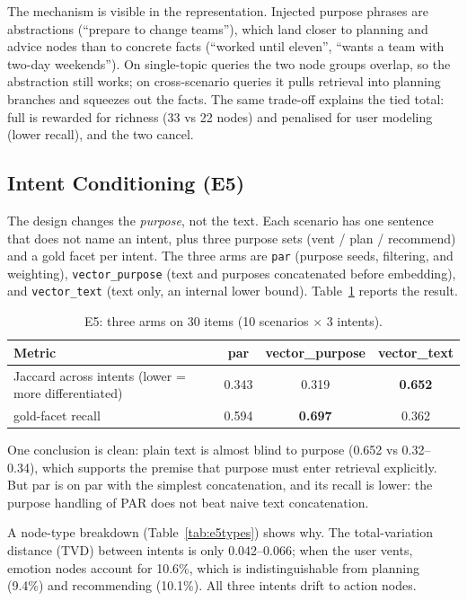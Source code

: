\documentclass[11pt]{article}
\begin{document}
The mechanism is visible in the representation. Injected purpose phrases are abstractions
(``prepare to change teams''), which land closer to planning and advice nodes than to concrete
facts (``worked until eleven'', ``wants a team with two-day weekends''). On single-topic queries
the two node groups overlap, so the abstraction still works; on cross-scenario queries it pulls
retrieval into planning branches and squeezes out the facts. The same trade-off explains the tied
total: full is rewarded for richness (33 vs 22 nodes) and penalised for user modeling (lower
recall), and the two cancel.

\subsection{Intent Conditioning (E5)}
\label{sec:e5}

The design changes the \emph{purpose}, not the text. Each scenario has one sentence that does not
name an intent, plus three purpose sets (vent / plan / recommend) and a gold facet per intent.
The three arms are \texttt{par} (purpose seeds, filtering, and weighting), \texttt{vector\_purpose}
(text and purposes concatenated before embedding), and \texttt{vector\_text} (text only, an
internal lower bound). Table~\ref{tab:e5} reports the result.

\begin{table}[t]
  \centering
  \small
  \begin{tabular}{@{}lccc@{}}
    \toprule
    Metric & par & vector\_purpose & vector\_text \\
    \midrule
    Jaccard across intents (lower = more differentiated) & 0.343 & 0.319 & \textbf{0.652} \\
    gold-facet recall & 0.594 & \textbf{0.697} & 0.362 \\
    \bottomrule
  \end{tabular}
  \caption{E5: three arms on 30 items (10 scenarios $\times$ 3 intents).}\label{tab:e5}
\end{table}

One conclusion is clean: plain text is almost blind to purpose (0.652 vs 0.32--0.34), which
supports the premise that purpose must enter retrieval explicitly. But par is on par with the
simplest concatenation, and its recall is lower: the purpose handling of PAR does not beat naive
text concatenation.

A node-type breakdown (Table~\ref{tab:e5types}) shows why. The total-variation distance (TVD)
between intents is only 0.042--0.066; when the user vents, emotion nodes account for 10.6\%, which
is indistinguishable from planning (9.4\%) and recommending (10.1\%). All three intents drift to
action nodes.
\end{document}
